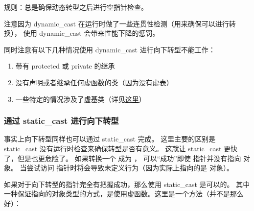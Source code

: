 \documentclass[../../LearnCpp.tex]{subfiles}
\begin{document}
规则：总是确保动态转型之后进行空指针检查。

注意因为 dynamic\_cast 在运行时做了一些连贯性检测（用来确保可以进行转换），
使用 dynamic\_cast 会带来性能下降的惩罚。

同时注意有以下几种情况使用 dynamic\_cast 进行向下转型不能工作：

\begin{enumerate}
  \item 带有 protected 或 private 的继承
  \item 没有声明或者继承任何虚函数的类（因为没有虚表）
  \item 一些特定的情况涉及了虚基类（详见\href{https://learn.microsoft.com/en-us/cpp/cpp/dynamic-cast-operator?redirectedfrom=MSDN&view=msvc-170}{这里}）
\end{enumerate}

\subsubsection*{通过 static\_cast 进行向下转型}

事实上向下转型同样也可以通过 static\_cast 完成。
这里主要的区别是 static\_cast 没有运行时检查来确保转型是否有意义。
这就让 static\_cast 更快了，但是也更危险了。
如果转换一个  成为 ，
可以“成功”即使  指针并没有指向  对象。
当尝试访问  指针时将会导致未定义行为（因为实际上指向的是  对象）。

如果对于向下转型的指针完全有把握成功，那么使用 static\_cast 是可以的。
其中一种保证指向的对象类型的方式，是使用虚函数。这里是一个方法（并不是那么好）：
\end{document}
